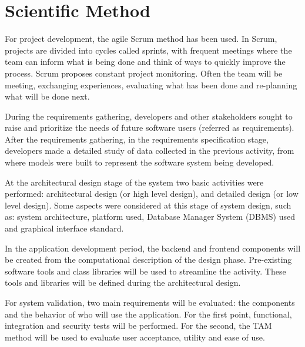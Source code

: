 \section{Scientific Method}\label{sec:method}

For project development, the agile Scrum method has been used. In Scrum, projects are divided into cycles called sprints, with frequent meetings where the team can inform what is being done and think of ways to quickly improve the process. Scrum proposes constant project monitoring. Often the team will be meeting, exchanging experiences, evaluating what has been done and re-planning what will be done next.

During the requirements gathering, developers and other stakeholders sought to raise and prioritize the needs of future software users (referred as requirements). After the requirements gathering, in the requirements specification stage, developers made a detailed study of data collected in the previous activity, from where models were built to represent the software system being developed.

At the architectural design stage of the system two basic activities were performed: architectural design (or high level design), and detailed design (or low level design). Some aspects were considered at this stage of system design, such as: system architecture, platform used, Database Manager System (DBMS) used and graphical interface standard.

In the application development period, the backend and frontend components will be created from the computational description of the design phase. Pre-existing software tools and class libraries will be used to streamline the activity. These tools and libraries will be defined during the architectural design.

For system validation, two main requirements will be evaluated: the components and the behavior of who will use the application. For the first point, functional, integration and security tests will be performed. For the second, the \acf{TAM} method will be used to evaluate user acceptance, utility and ease of use.